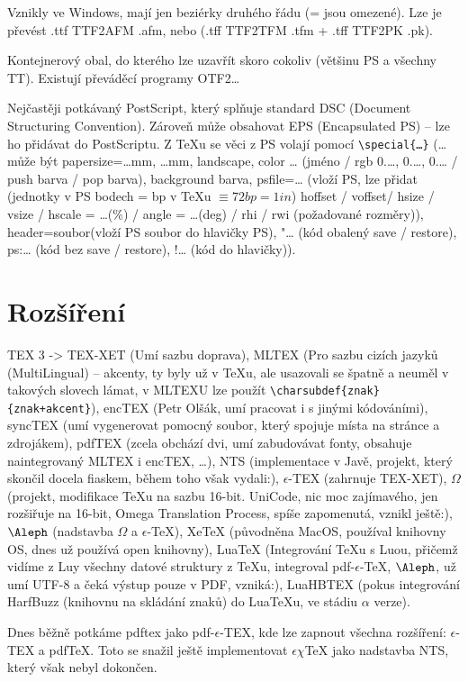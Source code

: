 \documentclass[12pt]{article}					%
\begin{document}
    \begin{definice}
        Vznikly ve Windows, mají jen beziérky druhého řádu (= jsou omezené). Lze je převést .ttf TTF2AFM .afm, nebo (.tff TTF2TFM .tfm + .tff TTF2PK .pk).
    \end{definice}

    \begin{definice}[OpenType]
        Kontejnerový obal, do kterého lze uzavřít skoro cokoliv (většinu PS a všechny TT). Existují převáděcí programy OTF2…
    \end{definice}


    \begin{definice}
            Nejčastěji potkávaný PostScript, který splňuje standard DSC (Document Structuring Convention). Zároveň může obsahovat EPS (Encapsulated PS) -- lze ho přidávat do PostScriptu. Z TeXu se věci z PS volají pomocí \verb|\special{…}| (… může být papersize=…mm, …mm, landscape, color … (jméno / rgb 0.…, 0.…, 0.… / push barva / pop barva), background barva, psfile=… (vloží PS, lze přidat (jednotky v PS bodech = bp v TeXu $≡ 72bp=1in$) hoffset / voffset/ hsize / vsize / hscale = …(\%) / angle = …(deg) / rhi / rwi (požadované rozměry)), header=soubor(vloží PS soubor do hlavičky PS), "… (kód obalený save / restore), ps:… (kód bez save / restore), !… (kód do hlavičky)).
    \end{definice}

\section{Rozšíření}
    \begin{definice}
            TEX 3 -> TEX-XET (Umí sazbu doprava), MLTEX (Pro sazbu cizích jazyků (MultiLingual) -- akcenty, ty byly už v TeXu, ale usazovali se špatně a neuměl v takových slovech lámat, v MLTEXU lze použít \verb|\charsubdef{znak}{znak+akcent}|), encTEX (Petr Olšák, umí pracovat i s jinými kódováními), syncTEX (umí vygenerovat pomocný soubor, který spojuje místa na stránce a zdrojákem), pdfTEX (zcela obchází dvi, umí zabudovávat fonty, obsahuje naintegrovaný MLTEX i encTEX, …), NTS (implementace v Javě, projekt, který skončil docela fiaskem, během toho však vydali:), $\epsilon$-TEX (zahrnuje TEX-XET), $\Omega$ (projekt, modifikace TeXu na sazbu 16-bit. UniCode, nic moc zajímavého, jen rozšiřuje na 16-bit, Omega Translation Process, spíše zapomenutá, vznikl ještě:), $\Aleph$ (nadstavba $\Omega$ a $\epsilon$-TeX), XeTeX (původněna MacOS, používal knihovny OS, dnes už používá open knihovny), LuaTeX (Integrování TeXu s Luou, přičemž vidíme z Luy všechny datové struktury z TeXu, integroval pdf-$\epsilon$-TeX, $\Aleph$, už umí UTF-8 a čeká výstup pouze v PDF, vzniká:), LuaHBTEX (pokus integrování HarfBuzz (knihovnu na skládání znaků) do LuaTeXu, ve stádiu $\alpha$ verze).

        Dnes běžně potkáme pdftex jako pdf-$\epsilon$-TEX, kde lze zapnout všechna rozšíření: $\epsilon$-TEX a pdfTeX. Toto se snažil ještě implementovat $\epsilon\chi$TeX jako nadstavba NTS, který však nebyl dokončen.
    \end{definice}
\end{document}
